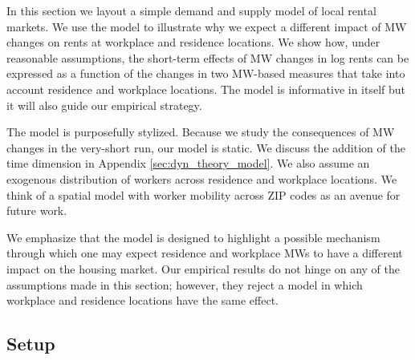 
In this section we layout a simple demand and supply model of local rental markets.
We use the model to illustrate why we expect a different impact of MW changes 
on rents at workplace and residence locations.
We show how, under reasonable assumptions, the short-term effects of MW changes 
in log rents can be expressed as a function of the changes in two MW-based measures
that take into account residence and workplace locations.
The model is informative in itself but it will also guide our empirical strategy.

The model is purposefully stylized.
Because we study the consequences of MW changes in the very-short run, our model is 
static.
We discuss the addition of the time dimension in Appendix \ref{sec:dyn_theory_model}.
We also assume an exogenous distribution of workers across residence and workplace 
locations.
We think of a spatial model with worker mobility across ZIP codes as an avenue 
for future work.

We emphasize that the model is designed to highlight a possible mechanism through 
which one may expect residence and workplace MWs to have a different impact on the 
housing market.
Our empirical results do not hinge on any of the assumptions made in this section;
however, they reject a model in which workplace and residence locations have the 
same effect.

\subsection{Setup}

